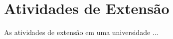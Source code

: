 
\chapter{Atividades de Extensão}\label{cap:extensao}

As atividades de extensão em uma universidade ...